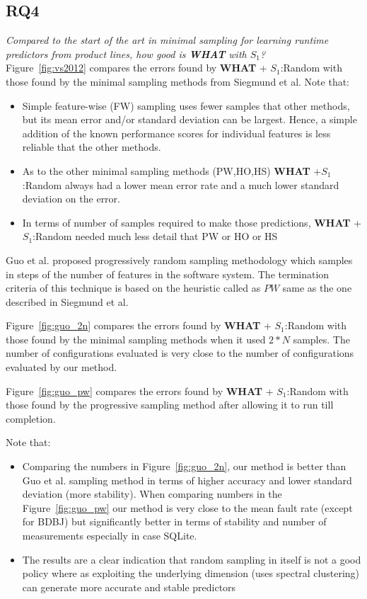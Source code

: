 \documentclass{sig-alternative}
\newcommand{\bi}{\begin{itemize}}%
\newcommand{\ei}{\end{itemize}}
\newcommand{\fig}[1]{Figure~\ref{fig:#1}}
\newcommand{\what}{{\bf WHAT }}
\begin{document}
 
\subsection{RQ4}
 
{\em Compared to the start of the art in minimal sampling for
learning runtime predictors from product lines, how good is \what with $S_1$?}\\









\fig{vs2012} compares the errors found by  \what+ $S_1$:Random with those found by the minimal sampling
methods from Siegmund et al. Note that:
\bi
\item
Simple feature-wise (FW) sampling uses fewer samples that 
other methods, but its mean error and/or standard deviation can be largest. Hence, a simple addition
of the known performance scores for individual features is less reliable that the other methods.
\item
As to the other minimal sampling methods  (PW,HO,HS)  \what+$S_1$:Random always had a   lower mean
error rate and a much lower standard deviation on the error.  
\item In terms of number of samples required to make those predictions, \what+$S_1$:Random needed
much less detail that PW or HO or HS
\ei


Guo et al. proposed progressively random sampling methodology which samples in steps of the number of features in the software system. The termination criteria of this technique is based on the heuristic called as $PW$ same as the one described in  Siegmund et al.

\fig{guo_2n} compares the errors found by  \what+ $S_1$:Random with those found by the minimal sampling
methods when it used $2*N$ samples. The number of configurations evaluated is very close to the  number of configurations evaluated by our method.

\fig{guo_pw} compares the errors found by  \what+ $S_1$:Random with those found by the progressive sampling method  after allowing it to run till completion.

Note that: 
\bi
\item
Comparing the numbers in \fig{guo_2n}, our method is better than Guo et al. sampling method in terms of higher accuracy and lower standard deviation (more stability). When comparing numbers in the \fig{guo_pw} our method is very close to the mean fault rate (except for BDBJ) but significantly better in terms of stability and number of measurements especially in case SQLite.
\item
The results are a clear indication that random sampling in itself is not a good policy where as exploiting the underlying dimension (uses spectral clustering) can generate more accurate and stable predictors
\ei
\end{document}
